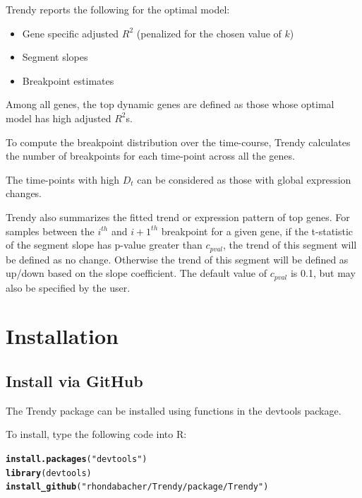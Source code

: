 \documentclass{article}\usepackage[]{graphicx}\usepackage[usenames,dvipsnames]{color}
\makeatletter
\newcommand{\hlstr}[1]{\textcolor[rgb]{0.192,0.494,0.8}{#1}}%
\newcommand{\hlstd}[1]{\textcolor[rgb]{0.345,0.345,0.345}{#1}}%
\newcommand{\hlkwd}[1]{\textcolor[rgb]{0.737,0.353,0.396}{\textbf{#1}}}%
\newenvironment{kframe}{%
 \def\at@end@of@kframe{}%
 \ifinner\ifhmode%
  \def\at@end@of@kframe{\end{minipage}}%
  \begin{minipage}{\columnwidth}%
 \fi\fi%
 \def\FrameCommand##1{\hskip\@totalleftmargin \hskip-\fboxsep
 \colorbox{shadecolor}{##1}\hskip-\fboxsep
     \hskip-\linewidth \hskip-\@totalleftmargin \hskip\columnwidth}%
 \MakeFramed {\advance\hsize-\width
   \@totalleftmargin\z@ \linewidth\hsize
   \@setminipage}}%
 {\par\unskip\endMakeFramed%
 \at@end@of@kframe}
\newenvironment{knitrout}{}{} %
\makeatother
\begin{document}
Trendy reports the following for the optimal model:
\begin{itemize}
  \item Gene specific adjusted $R^2$ (penalized for the chosen value of $k$)
  \item Segment slopes
  \item Breakpoint estimates
\end{itemize}

Among all genes, the top dynamic genes are defined as those whose optimal model has high adjusted $R^2$s.

To compute the breakpoint distribution over the time-course, Trendy calculates the number of 
breakpoints for each time-point across all the genes.

The time-points with high $D_t$ can be considered as those with global expression changes.

Trendy also summarizes the fitted trend or expression pattern of top genes. For samples between the $i^{th}$
and $i+1 ^{th}$ breakpoint for a given gene, if the t-statistic of
the segment slope has p-value greater than $c_{pval}$,
the trend of this segment will be defined as no change. Otherwise the
trend of this segment will be defined as up/down based on the slope coefficient.
The default value of $c_{pval}$ is 0.1, but may also be specified by the user.

\section{Installation}

\subsection{Install via GitHub}

The Trendy package can be installed using functions in the devtools package.

To install, type the following code into R:
\begin{knitrout}
\color{fgcolor}\begin{kframe}
\begin{alltt}
\hlkwd{install.packages}\hlstd{(}\hlstr{"devtools"}\hlstd{)}
\hlkwd{library}\hlstd{(devtools)}
\hlkwd{install_github}\hlstd{(}\hlstr{"rhondabacher/Trendy/package/Trendy"}\hlstd{)}
\end{alltt}
\end{kframe}
\end{knitrout}
\end{document}
